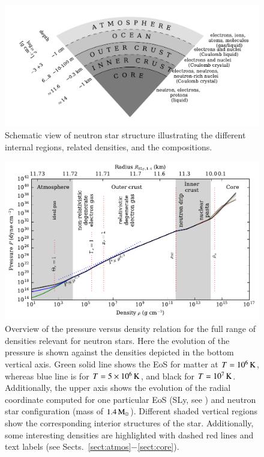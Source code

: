 \begin{figure}[t!]
\centering
\includegraphics[width=15.5cm]{figs/slice/atmos.pdf}
\caption{\label{fig:pizza}
Schematic view of neutron star structure illustrating the different internal regions, related densities, and the compositions.
}
\end{figure}


\begin{figure}[t!]
\centering
\includegraphics[width=15.5cm]{figs/eos/eos.pdf}
\caption{\label{fig:eos}
Overview of the pressure versus density relation for the full range of densities relevant for neutron stars.
Here the evolution of the pressure is shown against the densities depicted in the bottom vertical axis.
Green solid line shows the EoS for matter at $T=10^6\, \mathrm{K}$, whereas blue line is for $T=5 \times 10^{6}\, \mathrm{K}$, and black for $T=10^7 \, \mathrm{K}$.
Additionally, the upper  axis shows the evolution of the radial coordinate computed for one particular EoS (SLy, see ) and neutron star configuration (mass of $1.4\, \mathrm{M}_{\odot}$).
Different shaded vertical regions show the corresponding interior structures of the star.
Additionally, some interesting densities are highlighted with dashed red lines and text labels (see Sects.~\ref{sect:atmos}$-$\ref{sect:core}). 
}
\end{figure}

